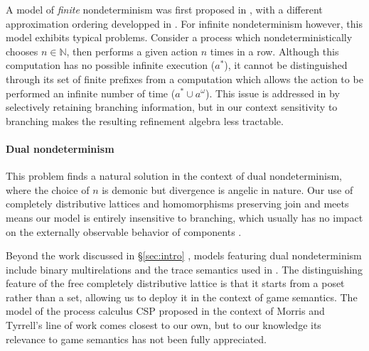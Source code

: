 \documentclass[sigplan,screen]{acmart}
\begin{document}
A model of \emph{finite} nondeterminism
was first proposed in \cite{gsfnd},
with a different approximation ordering
developped in \cite{gseia}.
For infinite nondeterminism however,
this model exhibits typical problems.
Consider a process which nondeterministically chooses $n \in \mathbb{N}$,
then performs a given action $n$ times in a row.
Although this computation has no possible infinite execution ($a^*$),
it cannot be distinguished through its set of finite prefixes
from a computation which allows the action to be performed an
infinite number of time ($a^* \cup a^\omega$).
This issue is addressed in \cite{gsndsheaves,nacgs}
by selectively retaining branching information,
but in our context sensitivity to branching makes
the resulting refinement algebra less tractable.


\paragraph{Dual nondeterminism}

This problem finds a natural solution
in the context of dual nondeterminism,
where the choice of $n$ is demonic but
divergence is angelic in nature.
Our use of completely distributive lattices and
homomorphisms preserving join and meets
means our model is entirely insensitive to branching,
which usually has no impact on the externally observable
behavior of components \cite{bltsp}.

Beyond the work discussed in \S\ref{sec:intro}
\cite{gc,backthesis,refcal,augtyp,dndf},
models featuring dual nondeterminism include
binary multirelations \cite{multirel,mrdnd}
and the trace semantics used in \cite{altref}.
The distinguishing feature of
the free completely distributive lattice
is that it starts from a poset rather than a set,
allowing us to deploy it in the context of game semantics.
The model of the process calculus CSP
proposed \cite{cspdnd} in the context of Morris and Tyrrell's line of work
comes closest to our own,
but to our knowledge its relevance to game semantics
has not been fully appreciated.
\end{document}
